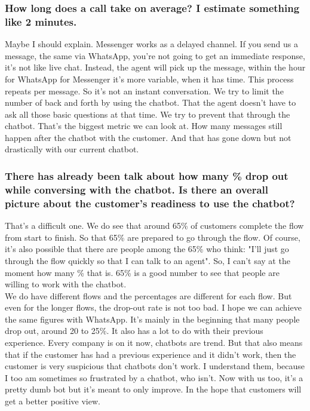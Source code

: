 \begin{appendices}
	\subsubsection{How long does a call take on average? I estimate something like 2 minutes.}
	Maybe I should explain. Messenger works as a delayed channel. If you send us a message, the same via WhatsApp, you're not going to get an immediate response, it's not like live chat. Instead, the agent will pick up the message, within the hour for WhatsApp for Messenger it's more variable, when it has time. This process repeats per message. So it's not an instant conversation. We try to limit the number of back and forth by using the chatbot. That the agent doesn't have to ask all those basic questions at that time. We try to prevent that through the chatbot. That's the biggest metric we can look at. How many messages still happen after the chatbot with the customer. And that has gone down but not drastically with our current chatbot.
	
	\subsubsection{There has already been talk about how many \% drop out while conversing with the chatbot. Is there an overall picture about the customer's readiness to use the chatbot?}
	That's a difficult one. We do see that around 65\% of customers complete the flow from start to finish. So that 65\% are prepared to go through the flow. Of course, it's also possible that there are people among the 65\% who think: "I'll just go through the flow quickly so that I can talk to an agent". So, I can't say at the moment how many \% that is. 65\% is a good number to see that people are willing to work with the chatbot.\\
	We do have different flows and the percentages are different for each flow. But even for the longer flows, the drop-out rate is not too bad. I hope we can achieve the same figures with WhatsApp. It's mainly in the beginning that many people drop out, around 20 to 25\%. It also has a lot to do with their previous experience. Every company is on it now, chatbots are trend. But that also means that if the customer has had a previous experience and it didn't work, then the customer is very suspicious that chatbots don't work. I understand them, because I too am sometimes so frustrated by a chatbot, who isn’t. Now with us too, it's a pretty dumb bot but it's meant to only improve. In the hope that customers will get a better positive view.
	

\end{appendices}
